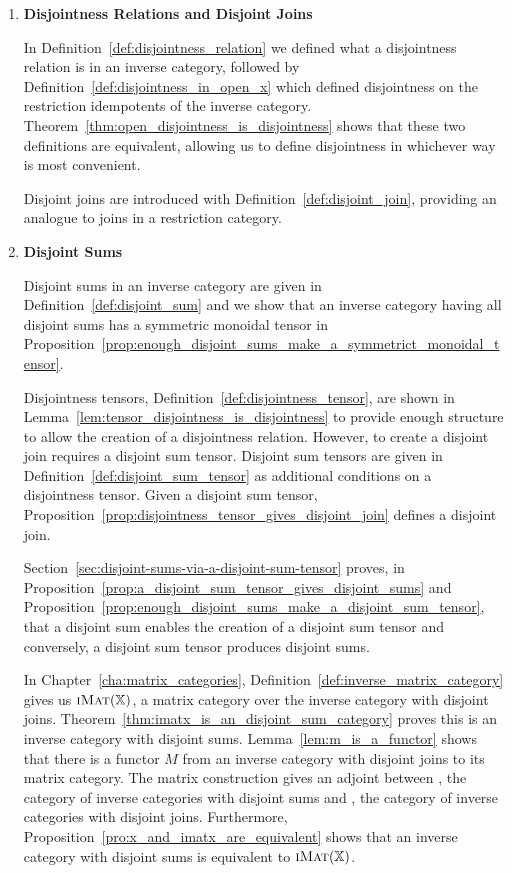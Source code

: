 \begin{enumerate}
\item \textbf{Disjointness Relations and Disjoint Joins}

In Definition~\ref{def:disjointness_relation} we defined what a disjointness relation is in an
inverse category, followed by Definition~\ref{def:disjointness_in_open_x} which defined disjointness
on the restriction idempotents of the inverse
category. Theorem~\ref{thm:open_disjointness_is_disjointness} shows that these two definitions are
equivalent, allowing us to define disjointness in whichever way is most convenient.

Disjoint joins are introduced with Definition~\ref{def:disjoint_join}, providing an analogue to
joins in a restriction category.

\item \textbf{Disjoint Sums}

Disjoint sums in an inverse category are given in Definition~\ref{def:disjoint_sum} and we show that
an inverse category having all disjoint sums has a symmetric monoidal tensor in
Proposition~\ref{prop:enough_disjoint_sums_make_a_symmetrict_monoidal_tensor}.

Disjointness tensors, Definition~\ref{def:disjointness_tensor}, are shown in
Lemma~\ref{lem:tensor_disjointness_is_disjointness} to provide enough structure to allow the
creation of a disjointness relation. However, to create a disjoint join requires a disjoint sum
tensor. Disjoint sum tensors are given in Definition~\ref{def:disjoint_sum_tensor} as additional
conditions on a disjointness tensor. Given a disjoint sum tensor,
Proposition~\ref{prop:disjointness_tensor_gives_disjoint_join} defines a disjoint join.

Section~\ref{sec:disjoint-sums-via-a-disjoint-sum-tensor} proves, in
Proposition~\ref{prop:a_disjoint_sum_tensor_gives_disjoint_sums} and
Proposition~\ref{prop:enough_disjoint_sums_make_a_disjoint_sum_tensor}, that a disjoint sum enables
the creation of a disjoint sum tensor and conversely, a disjoint sum tensor produces disjoint sums.

In Chapter~\ref{cha:matrix_categories}, Definition~\ref{def:inverse_matrix_category} gives us
$\textsc{iMat}({\mathbb{X}})$, a matrix category over the inverse category \X with disjoint
joins. Theorem~\ref{thm:imatx_is_an_disjoint_sum_category} proves this is an inverse category with
disjoint sums. Lemma~\ref{lem:m_is_a_functor} shows that there is a functor $M$ from an inverse
category with disjoint joins to its matrix category.  The matrix construction gives an adjoint
between \DSum, the category of inverse categories with disjoint sums and \DJoin, the category of
inverse categories with disjoint joins. Furthermore,
Proposition~\ref{pro:x_and_imatx_are_equivalent} shows that an inverse category \X with disjoint
sums is equivalent to $\textsc{iMat}({\mathbb{X}})$.



\end{enumerate}

